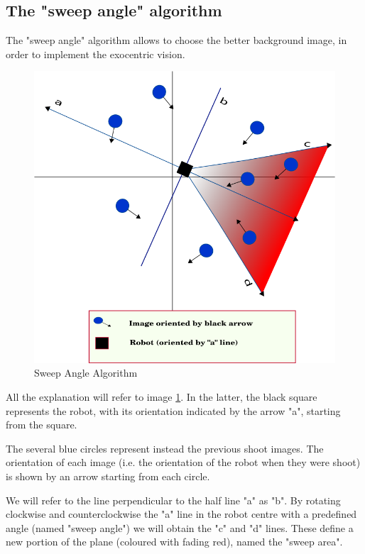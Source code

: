 \subsection{The "sweep angle" algorithm}
\label{subsec:sweep_angle_algorithm}
The "sweep angle" algorithm allows to choose the better background image, in order to implement
the exocentric vision.
%
\begin{figure}[!h]
  \begin{center}
    \includegraphics[width=400pt]{img/half_plan_finding.png} 
    \caption{Sweep Angle Algorithm}
    \label{fig:half_plan_finding}
  \end{center}
\end{figure}
%
All the explanation will refer to image \ref{fig:half_plan_finding}. In the latter, the black
square represents the robot, with its orientation indicated by the arrow "a", starting from the
square.
%

%
The several blue circles represent instead the previous shoot images. The orientation of each
image (i.e. the orientation of the robot when they were shoot) is shown by an arrow starting from
each circle.
%

%
We will refer to the line perpendicular to the half line "a" as "b". By rotating clockwise and
counterclockwise the "a" line in the robot centre with a predefined angle (named "sweep angle")
we will obtain the "c" and "d" lines. These define a new portion of the plane (coloured with fading red),
named the "sweep area".
%

